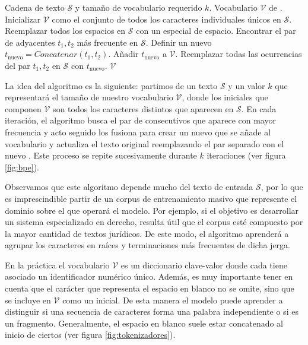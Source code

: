 \begin{algorithm*}
    \caption{Algoritmo de codificación de pares de bytes (BPE)}
    \label{alg:bpe}
    \begin{algorithmic}[1]
    \Require Cadena de texto $\mathcal{S}$ y tamaño de vocabulario requerido $k$.
    \Ensure Vocabulario $\mathcal{V}$ de \tokens{}.
    \State Inicializar $\mathcal{V}$ como el conjunto de todos los caracteres individuales únicos en $\mathcal{S}$.
    \State Reemplazar todos los espacios en $\mathcal{S}$ con un \token{} especial de espacio.
        \State Encontrar el par de \tokens{} adyacentes $t_1, t_2$ más frecuente en $\mathcal{S}$.
        \State Definir un nuevo \token{} $t_{\text{nuevo}} = Concatenar(t_1,t_2)$.
        \State Añadir $t_{\text{nuevo}}$ a $\mathcal{V}$.
        \State Reemplazar todas las ocurrencias del par $t_1, t_2$ en $\mathcal{S}$ con $t_{\text{nuevo}}$.
    \EndWhile
    \State \Return $\mathcal{V}$
    \end{algorithmic}
\end{algorithm*}
La idea del algoritmo es la siguiente: partimos de un texto $\mathcal{S}$ y 
un valor $k$ que representará el tamaño de nuestro vocabulario $\mathcal{V}$, 
donde los \tokens{} iniciales que componen $\mathcal{V}$ son todos los caracteres 
distintos que aparecen en $\mathcal{S}$. En cada iteración, el algoritmo busca el 
par de \tokens{} consecutivos que aparece con mayor frecuencia y acto seguido los 
fusiona para crear un \token{} nuevo que se añade al vocabulario y actualiza el texto 
original reemplazando el par separado con el nuevo \token{}. Este proceso se repite 
sucesivamente durante $k$ iteraciones (ver figura \ref{fig:bpe}).

Observamos que este algoritmo depende mucho del texto de entrada $\mathcal{S}$, 
por lo que es imprescindible partir de un corpus de entrenamiento masivo que 
represente el dominio sobre el que operará el modelo. Por ejemplo, si el objetivo es 
desarrollar un sistema especializado en derecho, resulta útil que el corpus esté 
compuesto por la mayor cantidad de textos jurídicos. De este modo, el algoritmo 
aprenderá a agrupar los caracteres en raíces y terminaciones más frecuentes de dicha 
jerga.

En la práctica el vocabulario $\mathcal{V}$ es un diccionario clave-valor donde 
cada \token{} tiene asociado un identificador numérico único. Además, es muy 
importante tener en cuenta que  el carácter que representa el espacio en blanco no 
se omite, sino que se incluye en $\mathcal{V}$ como un \token inicial. De esta manera 
el modelo puede aprender a distinguir si una secuencia de caracteres forma una palabra 
independiente o si es un fragmento. Generalmente, el espacio en blanco suele estar 
concatenado al inicio de ciertos \tokens{} (ver figura \ref{fig:tokenizadores}).


